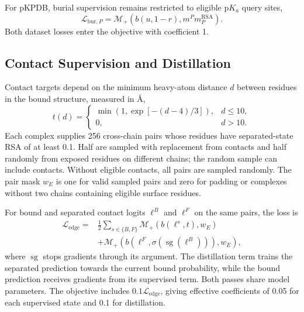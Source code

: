 For pKPDB, burial supervision remains restricted to eligible $\mathrm{p}K_a$ query sites,
\begin{equation}
    \mathcal L_{\mathrm{bur},P}
    =\mathcal M_+\!\left(b(u,1-r),m^P m_P^{\mathrm{RSA}}\right).
    \label{eq:jaxka-pkpdb-burial-loss}
\end{equation}
Both dataset losses enter the objective with coefficient 1.

\subsection{Contact Supervision and Distillation}
\label{app:jaxka-contact-loss}

Contact targets depend on the minimum heavy-atom distance $d$ between residues in the bound structure, measured in \AA{},
\begin{equation}
    t(d)=
    \begin{cases}
        \min\!\left(1,\exp[-(d-4)/3]\right), & d\leq10,\\
        0, & d>10.
    \end{cases}
    \label{eq:jaxka-contact-target}
\end{equation}
Each complex supplies 256 cross-chain pairs whose residues have separated-state RSA of at least 0.1. Half are sampled with replacement from contacts and half randomly from exposed residues on different chains; the random sample can include contacts. Without eligible contacts, all pairs are sampled randomly. The pair mask $w_E$ is one for valid sampled pairs and zero for padding or complexes without two chains containing eligible surface residues.

For bound and separated contact logits $\ell^B$ and $\ell^F$ on the same pairs, the loss is
\begin{equation}
    \begin{aligned}
        \mathcal L_{\mathrm{edge}}
        ={}&\tfrac12\sum_{s\in\{B,F\}}
        \mathcal M_+\!\left(b(\ell^s,t),w_E\right)\\
        &+\mathcal M_+\!\left(
        b\!\left(\ell^F,\sigma(\operatorname{sg}(\ell^B))\right),w_E
        \right),
    \end{aligned}
    \label{eq:jaxka-contact-loss}
\end{equation}
where $\operatorname{sg}$ stops gradients through its argument. The distillation term trains the separated prediction towards the current bound probability, while the bound prediction receives gradients from its supervised term. Both passes share model parameters. The objective includes $0.1\mathcal L_{\mathrm{edge}}$, giving effective coefficients of 0.05 for each supervised state and 0.1 for distillation.

